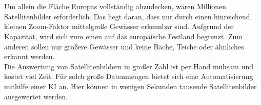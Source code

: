 %
\\
\\
Um allein die Fläche Europas vollständig abzudecken, wären Millionen Satellitenbilder erforderlich.
Das liegt daran, dass nur durch einen hinreichend kleinen Zoom-Faktor mittelgroße Gewässer erkennbar sind.
Aufgrund der Kapazität, wird sich zum einen auf das europäische Festland begrenzt.
Zum anderen sollen nur größere Gewässer und keine Bäche, Teiche oder ähnliches erkannt werden.
\\
Die Auswertung von Satellitenbildern in großer Zahl ist per Hand mühsam und kostet viel Zeit.
Für solch große Datenmengen bietet sich eine Automatisierung mithilfe einer KI an.
Hier können in wenigen Sekunden tausende Satellitenbilder ausgewertet werden.